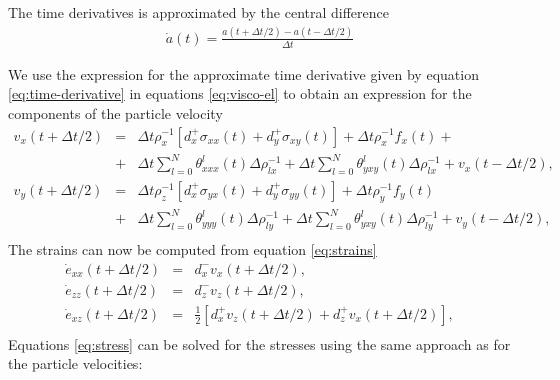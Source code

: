 \documentclass[11pt]{article}
\begin{document}
The time derivatives is approximated by the central difference
\begin{eqnarray}
\dot{a}(t) = \frac{a(t+\Delta t/2) - a(t-\Delta t/2)}{\Delta t}
                      \label{eq:time-derivative}
\end{eqnarray}

We use the expression for the approximate time derivative given by 
equation \eqref{eq:time-derivative}
in equations \eqref{eq:visco-el} to obtain an expression for the 
components of the particle velocity
\begin{eqnarray}
v_x(t+\Delta t/2) 
      & = & \Delta t\rho_x^{-1}\left[d^+_x \sigma_{xx}(t) 
            +d^+_y \sigma_{xy}(t)\right] 
            + \Delta t \rho_x^{-1}f_x(t) +                    \nonumber\\ 
      & + & \Delta t\sum_{l=0}^N\theta^l_{xxx}(t)\Delta\rho^{-1}_{lx}
            + \Delta t\sum_{l=0}^N\theta^l_{yxy}(t)\Delta\rho^{-1}_{lx} 
            +v_x(t-\Delta t/2),\nonumber\\
v_y(t+\Delta t/2) & = &  \Delta t \rho_z^{-1}\left[
            d^+_x \sigma_{yx}(t) 
            +d^+_y \sigma_{yy}(t)\right] 
            +\Delta t \rho_y^{-1}f_y(t)\nonumber\\  
      & + & \Delta t\sum_{l=0}^N\theta^l_{yyy}(t)\Delta\rho^{-1}_{ly}
            +  \Delta t\sum_{l=0}^N\theta^l_{yxy}(t)\Delta\rho^{-1}_{ly} 
            +v_y(t-\Delta t/2),\nonumber\\
                       \label{eq:vi-2d}
\end{eqnarray}
The strains can now be computed from equation \eqref{eq:strains}
\begin{eqnarray}
  \dot{e}_{xx}(t+\Delta t/2) & = & d^-_x v_x(t+\Delta t/2),     \nonumber  \\
  \dot{e}_{zz}(t+\Delta t/2) & = & d^-_z v_z(t+\Delta t/2),     \nonumber  \\
  \dot{e}_{xz}(t+\Delta t/2) & = & \frac{1}{2}\left[d^+_x v_z(t+\Delta t/2) 
                             + d^+_z v_x(t+\Delta t/2)\right], \nonumber   \\
                       \label{eq:strain2d}
\end{eqnarray}
%
Equations \eqref{eq:stress}   can be solved for the stresses using 
the same approach as for the particle velocities:
\end{document}
